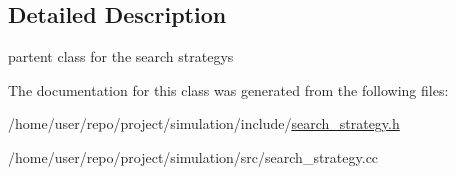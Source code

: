 \subsection{Detailed Description}
partent class for the search strategys 

The documentation for this class was generated from the following files\+:\begin{DoxyCompactItemize}
\item 
/home/user/repo/project/simulation/include/\hyperlink{search__strategy_8h}{search\+\_\+strategy.\+h}\item 
/home/user/repo/project/simulation/src/search\+\_\+strategy.\+cc\end{DoxyCompactItemize}
